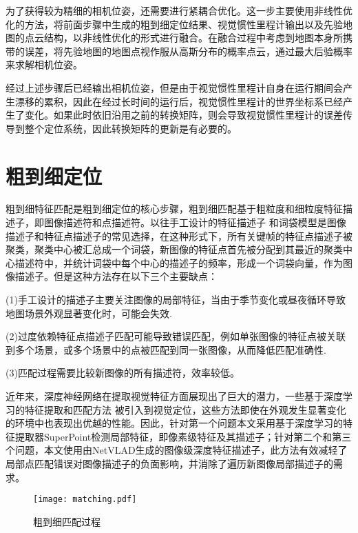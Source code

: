 为了获得较为精细的相机位姿，还需要进行紧耦合优化。这一步主要使用非线性优化的方法，将前面步骤中生成的粗到细定位结果、视觉惯性里程计输出以及先验地图的点云结构，以非线性优化的形式进行融合。在融合过程中考虑到地图本身所携带的误差，将先验地图的地图点视作服从高斯分布的概率点云，通过最大后验概率来求解相机位姿。

经过上述步骤后已经输出相机位姿，但是由于视觉惯性里程计自身在运行期间会产生漂移的累积，因此在经过长时间的运行后，视觉惯性里程计的世界坐标系已经产生了变化。如果此时依旧沿用之前的转换矩阵，则会导致视觉惯性里程计的误差传导到整个定位系统，因此转换矩阵的更新是有必要的。


\section{粗到细定位}
\label{sec:c2f_loc}

粗到细特征匹配是粗到细定位的核心步骤，粗到细匹配基于粗粒度和细粒度特征描述子，即图像描述符和点描述符。以往手工设计的特征描述子 \cite{lowe2004distinctive, rublee2011orb}和词袋模型是图像描述子和特征点描述子的常见选择，在这种形式下，所有关键帧的特征点描述子被聚类，聚类中心被汇总成一个词袋，新图像的特征点首先被分配到其最近的聚类中心描述符中，并统计词袋中每个中心的描述子的频率，形成一个词袋向量，作为图像描述子。但是这种方法存在以下三个主要缺点：

(1)手工设计的描述子主要关注图像的局部特征，当由于季节变化或昼夜循环导致地图场景外观显著变化时，可能会失效.

(2)过度依赖特征点描述子匹配可能导致错误匹配，例如单张图像的特征点被关联到多个场景，或多个场景中的点被匹配到同一张图像，从而降低匹配准确性.

(3)匹配过程需要比较新图像的所有描述符，效率较低。

近年来，深度神经网络在提取视觉特征方面展现出了巨大的潜力，一些基于深度学习的特征提取和匹配方法 \cite{detone2018superpoint, arandjelovic2016netvlad, sarlin2020superglue} 被引入到视觉定位，这些方法即使在外观发生显著变化的环境中也表现出优越的性能。因此，针对第一个问题本文采用基于深度学习的特征提取器SuperPoint\cite{detone2018superpoint}检测局部特征，即像素级特征及其描述子；针对第二个和第三个问题，本文使用由NetVLAD\cite{arandjelovic2016netvlad}生成的图像级深度特征描述子，此方法有效减轻了局部点匹配错误对图像描述子的负面影响，并消除了遍历新图像局部描述子的需求。

\begin{figure}
  \centering
  \texttt{[image: matching.pdf]}
  \caption{粗到细匹配过程}
  \label{fig:matching}
\end{figure}

